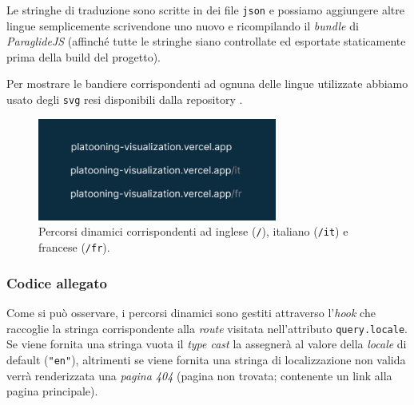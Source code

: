 Le stringhe di traduzione sono scritte in dei file \texttt{json} e possiamo aggiungere altre lingue semplicemente scrivendone uno nuovo e ricompilando il \textit{bundle} di \textit{ParaglideJS} (affinché tutte le stringhe siano controllate ed esportate staticamente prima della build del progetto).    

Per mostrare le bandiere corrispondenti ad ognuna delle lingue utilizzate abbiamo usato degli \texttt{svg} resi disponibili dalla repository .

\begin{figure}[H]
    \vspace{0.8em}
    \centering
    \captionsetup{justification=centering, margin=1.5cm}
    \includegraphics[width=0.7\textwidth, keepaspectratio]{images/4-frontend/dynamic-routes.png}
    \caption{Percorsi dinamici corrispondenti ad inglese (\texttt{/}), italiano (\texttt{/it}) e francese (\texttt{/fr}).}
    \label{fig:dynamic-routes}
\end{figure}

\newpage
\subsubsection*{Codice allegato}

\vspace{0.2em}

\vspace{0.4em}

Come si può osservare, i percorsi dinamici sono gestiti attraverso l'\textit{hook}  che raccoglie la stringa corrispondente alla \textit{route} visitata nell'attributo \texttt{query.locale}. Se viene fornita una stringa vuota il \textit{type cast} la assegnerà al valore della \textit{locale} di default (\texttt{"en"}), altrimenti se viene fornita una stringa di localizzazione non valida verrà renderizzata una \textit{pagina 404} (pagina non trovata; contenente un link alla pagina principale).

